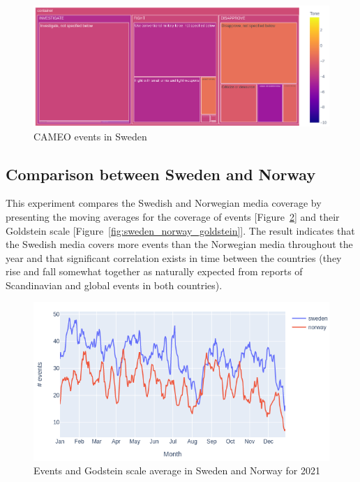 \documentclass[a4, 11pt]{article}
\begin{document}
\begin{figure}[htbp]
    \centering
    \includegraphics[scale=0.38]{Images/CAMEO.png}%
    \caption{CAMEO events in Sweden} 
    \label{fig:cameo}
\end{figure}

 \subsection{Comparison between Sweden and Norway}

 This experiment compares the Swedish and Norwegian media coverage
 by presenting the moving averages for the coverage of events
 [Figure~\ref{fig:sweden_norway_events}] and their Goldstein scale
 [Figure~\ref{fig:sweden_norway_goldstein}]. The result indicates that the
 Swedish media covers more events than the Norwegian media throughout the year and that significant correlation exists in time between the countries (they rise and fall somewhat together as naturally expected from reports of Scandinavian and global events in both  countries).

\begin{figure}[htbp]
    \centering
    \includegraphics[width=\textwidth]{Images/sweden_norway_events.png}%
    \caption{Events and Godstein scale average in Sweden and Norway for 2021} 
    \label{fig:sweden_norway_events}
\end{figure}
\end{document}
